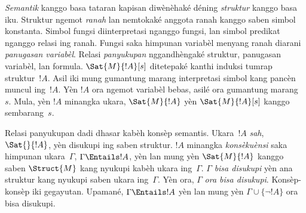 \emph{Semantik} kanggo basa tataran kapisan diwènèhaké déning
\emph{struktur} kanggo basa iku. Struktur ngemot \emph{ranah}
lan nemtokaké anggota ranah kanggo saben simbol konstanta.
Simbol fungsi diinterpretasi nganggo fungsi, lan simbol predikat
nganggo relasi ing ranah. Fungsi saka himpunan variabèl menyang
ranah diarani \emph{panugasan variabèl}. Relasi \emph{panyukupan}
nggandhèngaké struktur, panugasan variabèl, lan formula.
$\Sat{M}{!A}[s]$ ditetepaké kanthi induksi tumrap struktur~$!A$.
Asil iki mung gumantung marang interpretasi simbol kang pancèn
muncul ing~$!A$. Yèn $!A$ ora ngemot variabèl bebas, asilé ora
gumantung marang~$s$. Mula, yèn $!A$ minangka ukara,
$\Sat{M}{!A}$ yèn $\Sat{M}{!A}[s]$ kanggo sembarang~$s$.

Relasi panyukupan dadi dhasar kabèh konsèp semantis. Ukara~$!A$
\emph{sah}, $\Sat{{}}{!A}$, yèn disukupi ing saben struktur.
$!A$ minangka \emph{konsèkuènsi} saka himpunan ukara~$\Gamma$,
$\Gamma\Entails !A$, yèn lan mung yèn $\Sat{M}{!A}$ kanggo
saben $\Struct{M}$ kang nyukupi kabèh ukara ing~$\Gamma$.
$\Gamma$ \emph{bisa disukupi} yèn ana struktur kang nyukupi
saben ukara ing~$\Gamma$. Yèn ora, $\Gamma$ \emph{ora bisa disukupi}.
Konsèp-konsèp iki gegayutan. Upamané, $\Gamma\Entails !A$
yèn lan mung yèn $\Gamma\cup\{\lnot !A\}$ ora bisa disukupi.
